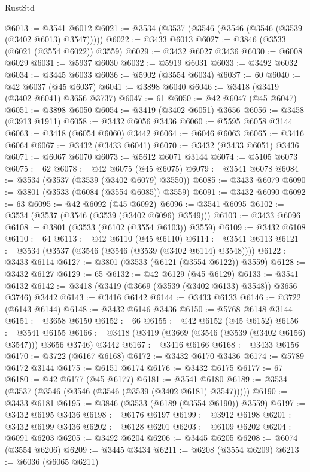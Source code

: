 \begin{lexlean}{RustStd}
\begin{coremodule}
@6013 := @3541 @6012
@6021 := @3534 (@3537 (@3546 (@3546 (@3546 (@3539 (@3402 @6013) @3547)))))
@6022 := @3433 @6013
@6027 := @3846 (@3533 (@6021 (@3554 @6022)) @3559)
@6029 := @3432 @6027 @3436
@6030 := @6008 @6029
@6031 := @5937 @6030
@6032 := @5919 @6031
@6033 := @3492 @6032
@6034 := @3445 @6033
@6036 := @5902 (@3554 @6034)
@6037 := 60
@6040 := @42 @6037 (@45 @6037)
@6041 := @3898 @6040
@6046 := @3418 (@3419 (@3402 @6041) @3656 @3737)
@6047 := 61
@6050 := @42 @6047 (@45 @6047)
@6051 := @3898 @6050
@6054 := @3419 (@3402 @6051) @3656
@6056 := @3458 (@3913 @1911)
@6058 := @3432 @6056 @3436
@6060 := @5595 @6058 @3144
@6063 := @3418 (@6054 @6060) @3442
@6064 := @6046 @6063
@6065 := @3416 @6064
@6067 := @3432 (@3433 @6041)
@6070 := @3432 (@3433 @6051) @3436
@6071 := @6067 @6070
@6073 := @5612 @6071 @3144
@6074 := @5105 @6073
@6075 := 62
@6078 := @42 @6075 (@45 @6075)
@6079 := @3541 @6078
@6084 := @3534 (@3537 (@3539 (@3402 @6079) @3550))
@6085 := @3433 @6079
@6090 := @3801 (@3533 (@6084 (@3554 @6085)) @3559)
@6091 := @3432 @6090
@6092 := 63
@6095 := @42 @6092 (@45 @6092)
@6096 := @3541 @6095
@6102 := @3534 (@3537 (@3546 (@3539 (@3402 @6096) @3549)))
@6103 := @3433 @6096
@6108 := @3801 (@3533 (@6102 (@3554 @6103)) @3559)
@6109 := @3432 @6108
@6110 := 64
@6113 := @42 @6110 (@45 @6110)
@6114 := @3541 @6113
@6121 := @3534 (@3537 (@3546 (@3546 (@3539 (@3402 @6114) @3548))))
@6122 := @3433 @6114
@6127 := @3801 (@3533 (@6121 (@3554 @6122)) @3559)
@6128 := @3432 @6127
@6129 := 65
@6132 := @42 @6129 (@45 @6129)
@6133 := @3541 @6132
@6142 := @3418 (@3419 (@3669 (@3539 (@3402 @6133) @3548)) @3656 @3746) @3442
@6143 := @3416 @6142
@6144 := @3433 @6133
@6146 := @3722 (@6143 @6144)
@6148 := @3432 @6146 @3436
@6150 := @5768 @6148 @3144
@6151 := @3658 @6150
@6152 := 66
@6155 := @42 @6152 (@45 @6152)
@6156 := @3541 @6155
@6166 := @3418 (@3419 (@3669 (@3546 (@3539 (@3402 @6156) @3547))) @3656 @3746) @3442
@6167 := @3416 @6166
@6168 := @3433 @6156
@6170 := @3722 (@6167 @6168)
@6172 := @3432 @6170 @3436
@6174 := @5789 @6172 @3144
@6175 := @6151 @6174
@6176 := @3432 @6175
@6177 := 67
@6180 := @42 @6177 (@45 @6177)
@6181 := @3541 @6180
@6189 := @3534 (@3537 (@3546 (@3546 (@3546 (@3539 (@3402 @6181) @3547)))))
@6190 := @3433 @6181
@6195 := @3846 (@3533 (@6189 (@3554 @6190)) @3559)
@6197 := @3432 @6195 @3436
@6198 := @6176 @6197
@6199 := @3912 @6198
@6201 := @3432 @6199 @3436
@6202 := @6128 @6201
@6203 := @6109 @6202
@6204 := @6091 @6203
@6205 := @3492 @6204
@6206 := @3445 @6205
@6208 := @6074 (@3554 @6206)
@6209 := @3445 @3434
@6211 := @6208 (@3554 @6209)
@6213 := @6036 (@6065 @6211)

\end{coremodule}
\end{lexlean}
